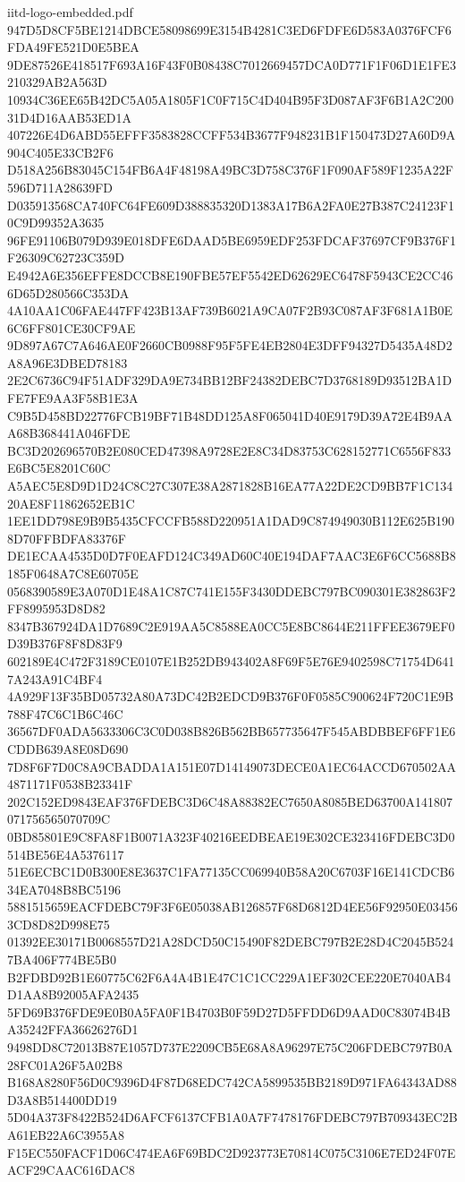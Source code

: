 \begin{filecontents*}[overwrite]{iitd-logo-embedded.pdf}
947D5D8CF5BE1214DBCE58098699E3154B4281C3ED6FDFE6D583A0376FCF6FDA49FE521D0E5BEA
9DE87526E418517F693A16F43F0B08438C7012669457DCA0D771F1F06D1E1FE3210329AB2A563D
10934C36EE65B42DC5A05A1805F1C0F715C4D404B95F3D087AF3F6B1A2C20031D4D16AAB53ED1A
407226E4D6ABD55EFFF3583828CCFF534B3677F948231B1F150473D27A60D9A904C405E33CB2F6
D518A256B83045C154FB6A4F48198A49BC3D758C376F1F090AF589F1235A22F596D711A28639FD
D035913568CA740FC64FE609D388835320D1383A17B6A2FA0E27B387C24123F10C9D99352A3635
96FE91106B079D939E018DFE6DAAD5BE6959EDF253FDCAF37697CF9B376F1F26309C62723C359D
E4942A6E356EFFE8DCCB8E190FBE57EF5542ED62629EC6478F5943CE2CC466D65D280566C353DA
4A10AA1C06FAE447FF423B13AF739B6021A9CA07F2B93C087AF3F681A1B0E6C6FF801CE30CF9AE
9D897A67C7A646AE0F2660CB0988F95F5FE4EB2804E3DFF94327D5435A48D2A8A96E3DBED78183
2E2C6736C94F51ADF329DA9E734BB12BF24382DEBC7D3768189D93512BA1DFE7FE9AA3F58B1E3A
C9B5D458BD22776FCB19BF71B48DD125A8F065041D40E9179D39A72E4B9AAA68B368441A046FDE
BC3D202696570B2E080CED47398A9728E2E8C34D83753C628152771C6556F833E6BC5E8201C60C
A5AEC5E8D9D1D24C8C27C307E38A2871828B16EA77A22DE2CD9BB7F1C13420AE8F11862652EB1C
1EE1DD798E9B9B5435CFCCFB588D220951A1DAD9C874949030B112E625B1908D70FFBDFA83376F
DE1ECAA4535D0D7F0EAFD124C349AD60C40E194DAF7AAC3E6F6CC5688B8185F0648A7C8E60705E
0568390589E3A070D1E48A1C87C741E155F3430DDEBC797BC090301E382863F2FF8995953D8D82
8347B367924DA1D7689C2E919AA5C8588EA0CC5E8BC8644E211FFEE3679EF0D39B376F8F8D83F9
602189E4C472F3189CE0107E1B252DB943402A8F69F5E76E9402598C71754D6417A243A91C4BF4
4A929F13F35BD05732A80A73DC42B2EDCD9B376F0F0585C900624F720C1E9B788F47C6C1B6C46C
36567DF0ADA5633306C3C0D038B826B562BB657735647F545ABDBBEF6FF1E6CDDB639A8E08D690
7D8F6F7D0C8A9CBADDA1A151E07D14149073DECE0A1EC64ACCD670502AA4871171F0538B23341F
202C152ED9843EAF376FDEBC3D6C48A88382EC7650A8085BED63700A141807071756565070709C
0BD85801E9C8FA8F1B0071A323F40216EEDBEAE19E302CE323416FDEBC3D0514BE56E4A5376117
51E6ECBC1D0B300E8E3637C1FA77135CC069940B58A20C6703F16E141CDCB634EA7048B8BC5196
5881515659EACFDEBC79F3F6E05038AB126857F68D6812D4EE56F92950E034563CD8D82D998E75
01392EE30171B0068557D21A28DCD50C15490F82DEBC797B2E28D4C2045B5247BA406F774BE5B0
B2FDBD92B1E60775C62F6A4A4B1E47C1C1CC229A1EF302CEE220E7040AB4D1AA8B92005AFA2435
5FD69B376FDE9E0B0A5FA0F1B4703B0F59D27D5FFDD6D9AAD0C83074B4BA35242FFA36626276D1
9498DD8C72013B87E1057D737E2209CB5E68A8A96297E75C206FDEBC797B0A28FC01A26F5A02B8
B168A8280F56D0C9396D4F87D68EDC742CA5899535BB2189D971FA64343AD88D3A8B514400DD19
5D04A373F8422B524D6AFCF6137CFB1A0A7F7478176FDEBC797B709343EC2BA61EB22A6C3955A8
F15EC550FACF1D06C474EA6F69BDC2D923773E70814C075C3106E7ED24F07EACF29CAAC616DAC8

\end{filecontents*}
